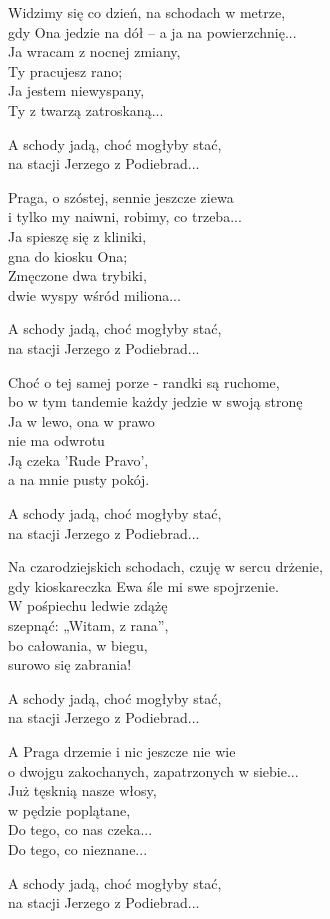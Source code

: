 \begin{text}
    Widzimy się co dzień, na schodach w metrze,\\
    gdy Ona jedzie na dół – a ja na powierzchnię...\\
    Ja wracam z nocnej zmiany,\\
    Ty pracujesz rano;\\
    Ja jestem niewyspany,\\
    Ty z twarzą zatroskaną...

    A schody jadą, choć mogłyby stać,\\
    na stacji Jerzego z Podiebrad...

    Praga, o szóstej, sennie jeszcze ziewa\\
    i tylko my naiwni, robimy, co trzeba...\\
    Ja spieszę się z kliniki,\\
    gna do kiosku Ona;\\
    Zmęczone dwa trybiki,\\
    dwie wyspy wśród miliona...

    A schody jadą, choć mogłyby stać,\\
    na stacji Jerzego z Podiebrad...

    Choć o tej samej porze - randki są ruchome,\\
    bo w tym tandemie każdy jedzie w swoją stronę\\
    Ja w lewo, ona w prawo\\
    nie ma odwrotu\\
    Ją czeka 'Rude Pravo',\\
    a na mnie pusty pokój.

    A schody jadą, choć mogłyby stać,\\
    na stacji Jerzego z Podiebrad...

    Na czarodziejskich schodach, czuję w sercu drżenie,\\
    gdy kioskareczka Ewa śle mi swe spojrzenie.\\
    W pośpiechu ledwie zdążę\\
    szepnąć: „Witam, z rana”,\\
    bo całowania, w biegu,\\
    surowo się zabrania!

    A schody jadą, choć mogłyby stać,\\
    na stacji Jerzego z Podiebrad...

    A Praga drzemie i nic jeszcze nie wie\\
    o dwojgu zakochanych, zapatrzonych w siebie...\\
    Już tęsknią nasze włosy,\\
    w pędzie poplątane,\\
    Do tego, co nas czeka...\\
    Do tego, co nieznane...

    A schody jadą, choć mogłyby stać,\\
    na stacji Jerzego z Podiebrad...
\end{text}
\begin{chord}

\end{chord}